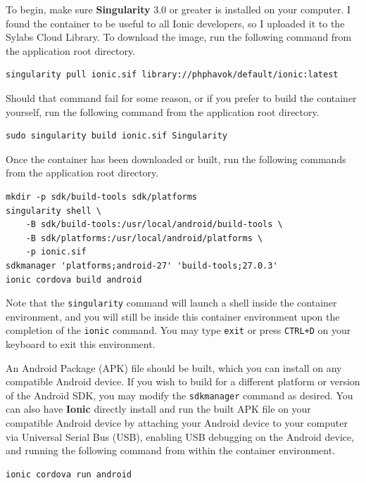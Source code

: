 \documentclass[12pt]{report}
\begin{document}
To begin, make sure \textbf{Singularity} 3.0 \cite{singularity3inst} or greater
is installed on your computer. I found the container to be useful to all Ionic
developers, so I uploaded it to the Sylabs Cloud Library. To download the image,
run the following command from the application root directory.

\begin{verbatim}
singularity pull ionic.sif library://phphavok/default/ionic:latest
\end{verbatim}

Should that command fail for some reason, or if you prefer to build the
container yourself, run the following command from the application root
directory.

\begin{verbatim}
sudo singularity build ionic.sif Singularity
\end{verbatim}

Once the container has been downloaded or built, run the following commands from
the application root directory.

\begin{verbatim}
mkdir -p sdk/build-tools sdk/platforms
singularity shell \
    -B sdk/build-tools:/usr/local/android/build-tools \
    -B sdk/platforms:/usr/local/android/platforms \
    -p ionic.sif
sdkmanager 'platforms;android-27' 'build-tools;27.0.3'
ionic cordova build android
\end{verbatim}

Note that the \texttt{singularity} command will launch a shell inside the
container environment, and you will still be inside this container environment
upon the completion of the \texttt{ionic} command. You may type \texttt{exit} or
press \texttt{CTRL+D} on your keyboard to exit this environment.

An Android Package (APK) file should be built, which you can install on any
compatible Android device. If you wish to build for a different platform or
version of the Android SDK, you may modify the \texttt{sdkmanager} command as
desired. You can also have \textbf{Ionic} directly install and run the built APK
file on your compatible Android device by attaching your Android device to your
computer via Universal Serial Bus (USB), enabling USB debugging on the Android
device, and running the following command from within the container environment.

\begin{verbatim}
ionic cordova run android
\end{verbatim}
\end{document}
